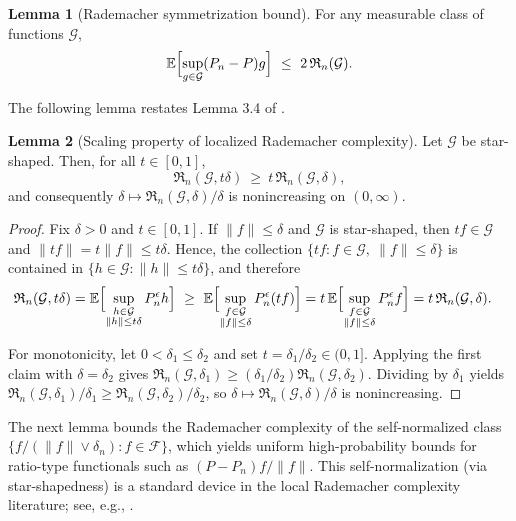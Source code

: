 \documentclass[11pt]{article}
\theoremstyle{plain}
\theoremstyle{definition} %
\newtheorem{lemma}{Lemma}
\begin{document}
 


\begin{lemma}[Rademacher symmetrization bound] \label{lem:rademacher}
For any measurable class of functions $\mathcal{G}$,
\[
\mathbb{E}\Bigl[\sup_{g\in\mathcal{G}} (P_n-P)g\Bigr]
\ \le\
2\,\mathfrak{R}_n(\mathcal{G}).
\]
\end{lemma}


The following lemma restates Lemma 3.4 of \cite{bartlett2005local}.

\begin{lemma}[Scaling property of localized Rademacher complexity]\label{lem:rad_scaling}
Let \(\mathcal{G}\) be star-shaped. Then, for all \(t\in[0,1]\),
\[
\mathfrak{R}_n(\mathcal{G},t\delta)\ \ge\ t\,\mathfrak{R}_n(\mathcal{G},\delta),
\]
and consequently \(\delta \mapsto \mathfrak{R}_n(\mathcal{G},\delta)/\delta\)
is nonincreasing on \((0,\infty)\).
\end{lemma}
\begin{proof}
Fix \(\delta>0\) and \(t\in[0,1]\). If \(\|f\|\le \delta\) and \(\mathcal{G}\) is
star-shaped, then \(tf\in\mathcal{G}\) and \(\|tf\|=t\|f\|\le t\delta\). Hence,
the collection \(\{tf: f\in\mathcal{G},\ \|f\|\le \delta\}\) is contained in
\(\{h\in\mathcal{G}: \|h\|\le t\delta\}\), and therefore
\begin{align*}
\mathfrak{R}_n(\mathcal{G},t\delta)
&=
\mathbb{E}\Bigl[\sup_{\substack{h\in\mathcal{G}\\ \|h\|\le t\delta}}
P_n^\epsilon h\Bigr]
\ \ge\
\mathbb{E}\Bigl[\sup_{\substack{f\in\mathcal{G}\\ \|f\|\le \delta}}
P_n^\epsilon (t f)\Bigr]
=
t\,\mathbb{E}\Bigl[\sup_{\substack{f\in\mathcal{G}\\ \|f\|\le \delta}}
P_n^\epsilon f\Bigr]
=
t\,\mathfrak{R}_n(\mathcal{G},\delta).
\end{align*}

For monotonicity, let \(0<\delta_1\le \delta_2\) and set \(t=\delta_1/\delta_2\in(0,1]\).
Applying the first claim with \(\delta=\delta_2\) gives
\(\mathfrak{R}_n(\mathcal{G},\delta_1)\ge (\delta_1/\delta_2)\mathfrak{R}_n(\mathcal{G},\delta_2)\).
Dividing by \(\delta_1\) yields
\(\mathfrak{R}_n(\mathcal{G},\delta_1)/\delta_1 \ge \mathfrak{R}_n(\mathcal{G},\delta_2)/\delta_2\),
so \(\delta\mapsto \mathfrak{R}_n(\mathcal{G},\delta)/\delta\) is nonincreasing.
\end{proof}




The next lemma bounds the Rademacher complexity of the self-normalized class
$\{f/(\|f\|\vee \delta_n): f\in\mathcal{F}\}$, which yields uniform
high-probability bounds for ratio-type functionals such as $(P-P_n)f/\|f\|$.
This self-normalization (via star-shapedness) is a standard device in the
local Rademacher complexity literature; see, e.g., \citet{bartlett2005local, mendelson2002improving}.
\end{document}
